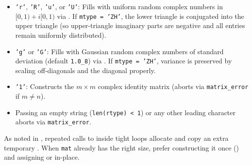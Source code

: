 \begin{enumerate}
  \begin{itemize}
    \item \texttt{'r'}, \texttt{'R'}, \texttt{'u'}, or \texttt{'U'}: Fills with uniform random complex numbers in $[0,1) + i[0,1)$ via . If \texttt{mtype = 'ZH'}, the lower triangle is conjugated into the upper triangle (so upper-triangle imaginary parts are negative and all entries remain uniformly distributed).
    \item \texttt{'g'} or \texttt{'G'}: Fills with Gaussian random complex numbers of standard deviation  (default \texttt{1.0\_8}) via . If \texttt{mtype = 'ZH'}, variance is preserved by scaling off-diagonals and the diagonal properly.
    \item \texttt{'1'}: Constructs the $m \times m$ complex identity matrix (aborts via \texttt{matrix\_error} if $m \neq n$).
    \item Passing an empty string (\texttt{len(rtype) < 1}) or any other leading character aborts via \texttt{matrix\_error}.
  \end{itemize}
\end{enumerate}

\begin{warnbox}
As noted in , repeated calls to  inside tight loops allocate and copy an extra temporary . When \texttt{mat} already has the right size, prefer constructing it once () and assigning  or  in-place.
\end{warnbox}

